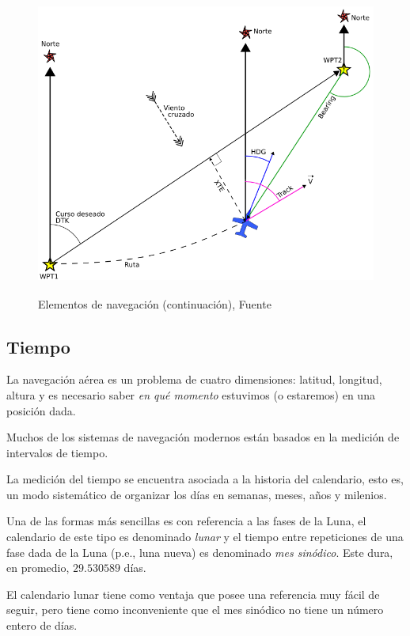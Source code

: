 \begin{figure}[!h]
  \centering
  \includegraphics[keepaspectratio,height=10cm]{06.radionavegacion/Imagenes/curso-derrota-rumbo-marcacion.png}  
  \caption{Elementos de navegaci\'on (continuaci\'on),  Fuente \protect\cite{Salazar_nav_aerea}}
  \label{fig:curso}
\end{figure}

\subsection{Tiempo}
\label{sec:tiempo}

La navegaci\'on a\'erea es un problema de cuatro dimensiones: latitud, longitud, altura y es necesario saber \emph{en qu\'e momento} estuvimos (o estaremos) en una posici\'on dada.

Muchos de los sistemas de navegaci\'on modernos est\'an basados en la medici\'on de intervalos de tiempo.

La medici\'on del tiempo se encuentra asociada a la historia del calendario, esto es, un modo sistem\'atico de organizar los d\'ias en semanas, meses, a\~nos y milenios.

 Una de las formas m\'as sencillas es con referencia a las fases de la Luna, el calendario de este tipo es denominado \emph{lunar} y el tiempo entre repeticiones de una fase dada de la Luna (p.e., luna nueva) es denominado \emph{mes sin\'odico}. Este dura, en promedio, $29.530589$ d\'ias.

 El calendario lunar tiene como ventaja que posee una referencia muy f\'acil de seguir, pero tiene como inconveniente que el mes sin\'odico no tiene un n\'umero entero de d\'ias.

